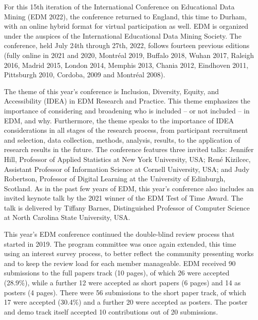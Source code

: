 \documentclass[letterpaper,11pt,oneside]{book} %
\begin{document}
\vspace*{0.5cm}



For this 15th iteration of the International Conference on Educational
Data Mining (EDM 2022), the conference returned to England, this time to
Durham, with an online hybrid format for virtual participation as well.
EDM is organized under the auspices of the International Educational
Data Mining Society. The conference, held July 24th through 27th, 2022,
follows fourteen previous editions (fully online in 2021 and 2020,
Montréal 2019, Buffalo 2018, Wuhan 2017, Raleigh 2016, Madrid 2015,
London 2014, Memphis 2013, Chania 2012, Eindhoven 2011, Pittsburgh 2010,
Cordoba, 2009 and Montréal 2008).

The theme of this year's conference is Inclusion, Diversity, Equity, and
Accessibility (IDEA) in EDM Research and Practice. This theme emphasizes
the importance of considering and broadening who is included -- or not
included -- in EDM, and why. Furthermore, the theme speaks to the
importance of IDEA considerations in all stages of the research process,
from participant recruitment and selection, data collection, methods,
analysis, results, to the application of research results in the future.
The conference features three invited talks: Jennifer Hill, Professor of
Applied Statistics at New York University, USA; René Kizilcec, Assistant
Professor of Information Science at Cornell University, USA; and Judy
Robertson, Professor of Digital Learning at the University of Edinburgh,
Scotland. As in the past few years of EDM, this year's conference also
includes an invited keynote talk by the 2021 winner of the EDM Test of
Time Award. The talk is delivered by Tiffany Barnes, Distinguished
Professor of Computer Science at North Carolina State University, USA.

This year's EDM conference continued the double-blind review process
that started in 2019. The program committee was once again extended,
this time using an interest survey process, to better reflect the
community presenting works and to keep the review load for each member
manageable. EDM received 90 submissions to the full papers track (10
pages), of which 26 were accepted (28.9\%), while a further 12 were
accepted as short papers (6 pages) and 14 as posters (4 pages). There
were 56 submissions to the short paper track, of which 17 were accepted
(30.4\%) and a further 20 were accepted as posters. The poster and demo
track itself accepted 10 contributions out of 20 submissions.
\end{document}
